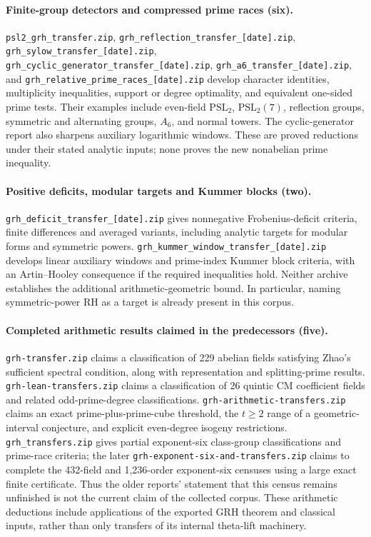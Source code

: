 \paragraph{Finite-group detectors and compressed prime races (six).}
\nolinkurl{psl2_grh_transfer.zip},
\nolinkurl{grh_reflection_transfer_[date].zip},
\nolinkurl{grh_sylow_transfer_[date].zip},
\nolinkurl{grh_cyclic_generator_transfer_[date].zip},
\nolinkurl{grh_a6_transfer_[date].zip}, and
\nolinkurl{grh_relative_prime_races_[date].zip}
develop character identities, multiplicity inequalities, support or degree
optimality, and equivalent one-sided prime tests. Their examples include
even-field $\mathrm{PSL}_2$, $\mathrm{PSL}_2(7)$, reflection groups,
symmetric and alternating groups, $A_6$, and normal towers.
The cyclic-generator report also sharpens auxiliary logarithmic windows.
These are proved reductions under their stated analytic inputs; none
proves the new nonabelian prime inequality.

\paragraph{Positive deficits, modular targets and Kummer blocks (two).}
\nolinkurl{grh_deficit_transfer_[date].zip} gives nonnegative
Frobenius-deficit criteria, finite differences and averaged variants,
including analytic targets for modular forms and symmetric powers.
\nolinkurl{grh_kummer_window_transfer_[date].zip} develops linear
auxiliary windows and prime-index Kummer block criteria, with an
Artin--Hooley consequence if the required inequalities hold.
Neither archive establishes the additional arithmetic-geometric bound.
In particular, naming symmetric-power RH as a target is already present
in this corpus.

\paragraph{Completed arithmetic results claimed in the predecessors (five).}
\nolinkurl{grh-transfer.zip} claims a classification of 229 abelian
fields satisfying Zhao's sufficient spectral condition, along with
representation and splitting-prime results.
\nolinkurl{grh-lean-transfers.zip} claims a classification of 26 quintic
CM coefficient fields and related odd-prime-degree classifications.
\nolinkurl{grh-arithmetic-transfers.zip} claims an exact prime-plus-prime-cube
threshold, the $t\ge2$ range of a geometric-interval conjecture, and
explicit even-degree isogeny restrictions.
\nolinkurl{grh_transfers.zip} gives partial exponent-six class-group
classifications and prime-race criteria; the later
\nolinkurl{grh-exponent-six-and-transfers.zip} claims to complete the
432-field and 1,236-order exponent-six censuses using a large exact
finite certificate. Thus the older reports' statement that this census
remains unfinished is not the current claim of the collected corpus.
These arithmetic deductions include applications of the exported GRH
theorem and classical inputs, rather than only transfers of its internal
theta-lift machinery.

